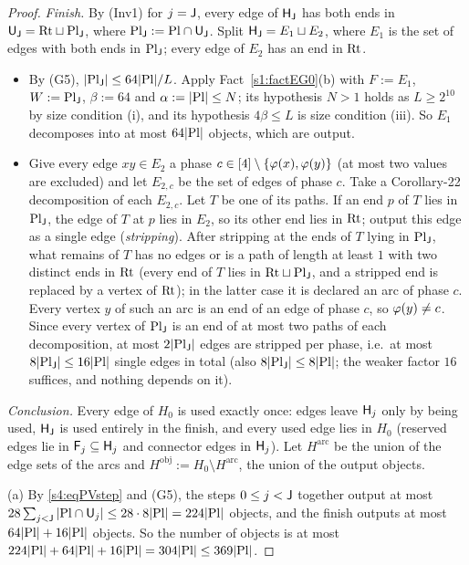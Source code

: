 \begin{proof}
\emph{Finish.} By (Inv1) for $j=\mathsf{J}$, every edge of $\mathsf{H}_{\mathsf{J}}$ has both ends in $\mathsf{U}_{\mathsf{J}}=\mathrm{Rt}\sqcup \mathrm{Pl}_{\mathsf{J}}$, where
$\mathrm{Pl}_{\mathsf{J}}:=\mathrm{Pl}\cap\mathsf{U}_{\mathsf{J}}$. Split $\mathsf{H}_{\mathsf{J}}=E_1\sqcup E_2$, where $E_1$ is the set of edges with both ends in
$\mathrm{Pl}_{\mathsf{J}}$; every edge of $E_2$ has an end in $\mathrm{Rt}$.
\begin{itemize}
\item By (G5), $|\mathrm{Pl}_{\mathsf{J}}|\le64|\mathrm{Pl}|/L$. Apply Fact~\ref{s1:factEG0}(b) with $F:=E_1$, $W:=\mathrm{Pl}_{\mathsf{J}}$, $\beta:=64$ and
  $\alpha:=|\mathrm{Pl}|\le N$; its hypothesis $N>1$ holds as $L\ge2^{10}$ by size condition (i), and its hypothesis $4\beta\le L$
  is size condition (iii). So $E_1$ decomposes into at most $64|\mathrm{Pl}|$
  objects, which are output.
\item Give every edge $xy\in E_2$ a phase $c\in[4]\setminus\{\varphi(x),\varphi(y)\}$ (at most two values are excluded)
  and let $E_{2,c}$ be the set of edges of phase $c$. Take a Corollary-22 decomposition of each $E_{2,c}$. Let $T$ be
  one of its paths. If an end $p$ of $T$ lies in $\mathrm{Pl}_{\mathsf{J}}$, the edge of $T$ at $p$ lies in $E_2$, so its other end
  lies in $\mathrm{Rt}$; output this edge as a single edge (\emph{stripping}). After stripping at the ends of $T$ lying in
  $\mathrm{Pl}_{\mathsf{J}}$, what remains of $T$ has no edges or is a path of length at least $1$ with two distinct ends in $\mathrm{Rt}$ (every end
  of $T$ lies in $\mathrm{Rt}\sqcup \mathrm{Pl}_{\mathsf{J}}$, and a stripped end is replaced by a vertex of $\mathrm{Rt}$); in the latter case it is
  declared an arc of phase $c$. Every vertex $y$ of such an arc is an end of an edge of phase $c$, so
  $\varphi(y)\ne c$. Since every vertex of $\mathrm{Pl}_{\mathsf{J}}$ is an end of at most two paths of each decomposition, at most
  $2|\mathrm{Pl}_{\mathsf{J}}|$ edges are stripped per phase, i.e.\ at most $8|\mathrm{Pl}_{\mathsf{J}}|\le16|\mathrm{Pl}|$ single
  edges in total (also $8|\mathrm{Pl}_{\mathsf{J}}|\le8|\mathrm{Pl}|$; the weaker factor $16$ suffices, and nothing
  depends on it).
\end{itemize}

\emph{Conclusion.} Every edge of $H_0$ is used exactly once: edges leave $\mathsf{H}_j$ only by being used, $\mathsf{H}_{\mathsf{J}}$ is
used entirely in the finish, and every used edge lies in $H_0$ (reserved edges lie in $\mathsf{F}_j\subseteq\mathsf{H}_j$ and
connector edges in $\mathsf{H}_j$). Let $H^{\mathrm{arc}}$ be the union of the edge sets of the arcs and
$H^{\mathrm{obj}}:=H_0\setminus H^{\mathrm{arc}}$, the union of the output objects.

(a) By \eqref{s4:eqPVstep} and (G5), the steps $0\le j<\mathsf{J}$ together output at most
$28\sum_{j<\mathsf{J}}|\mathrm{Pl}\cap\mathsf{U}_j|\le28\cdot8|\mathrm{Pl}|=224|\mathrm{Pl}|$ objects, and the finish outputs at most $64|\mathrm{Pl}|+16|\mathrm{Pl}|$
objects. So the number of objects is at most $224|\mathrm{Pl}|+64|\mathrm{Pl}|+16|\mathrm{Pl}|=304|\mathrm{Pl}|\le369|\mathrm{Pl}|$.


\end{proof}
